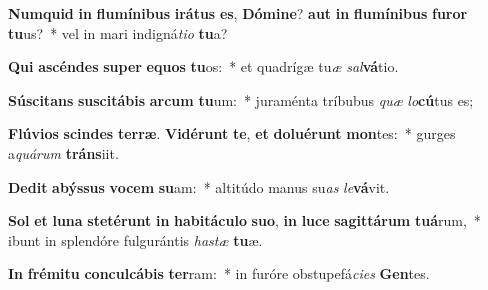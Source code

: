 \item \textbf{Num}\textbf{quid} \textbf{in} \textbf{flu}\textbf{mí}\textbf{ni}\textbf{bus} \textbf{i}\textbf{rá}\textbf{tus} \textbf{es}, \textbf{Dó}\textbf{mi}\textbf{ne}? \textbf{aut} \textbf{in} \textbf{flu}\textbf{mí}\textbf{ni}\textbf{bus} \textbf{fu}\textbf{ror} \textbf{tu}us?~* vel in mari indigná\textit{ti}\textit{o} \textbf{tu}a?
\item \textbf{Qui} \textbf{a}\textbf{scén}\textbf{des} \textbf{su}\textbf{per} \textbf{e}\textbf{quos} \textbf{tu}os:~* et quadrígæ tu\textit{æ} \textit{sal}\textbf{vá}tio.
\item \textbf{Sú}\textbf{sci}\textbf{tans} \textbf{su}\textbf{sci}\textbf{tá}\textbf{bis} \textbf{ar}\textbf{cum} \textbf{tu}um:~* juraménta tríbubus \textit{quæ} \textit{lo}\textbf{cú}tus es;
\item \textbf{Flú}\textbf{vi}\textbf{os} \textbf{scin}\textbf{des} \textbf{ter}\textbf{ræ}. \textbf{Vi}\textbf{dé}\textbf{runt} \textbf{te}, \textbf{et} \textbf{do}\textbf{lu}\textbf{é}\textbf{runt} \textbf{mon}tes:~* gurges a\textit{quá}\textit{rum} \textbf{tráns}iit.
\item \textbf{De}\textbf{dit} \textbf{a}\textbf{býs}\textbf{sus} \textbf{vo}\textbf{cem} \textbf{su}am:~* altitúdo manus su\textit{as} \textit{le}\textbf{vá}vit.
\item \textbf{Sol} \textbf{et} \textbf{lu}\textbf{na} \textbf{ste}\textbf{té}\textbf{runt} \textbf{in} \textbf{ha}\textbf{bi}\textbf{tá}\textbf{cu}\textbf{lo} \textbf{su}\textbf{o}, \textbf{in} \textbf{lu}\textbf{ce} \textbf{sa}\textbf{git}\textbf{tá}\textbf{rum} \textbf{tu}\textbf{á}rum,~* ibunt in splendóre fulgurántis \textit{has}\textit{tæ} \textbf{tu}æ.
\item \textbf{In} \textbf{fré}\textbf{mi}\textbf{tu} \textbf{con}\textbf{cul}\textbf{cá}\textbf{bis} \textbf{ter}ram:~* in furóre obstupefá\textit{ci}\textit{es} \textbf{Gen}tes.
